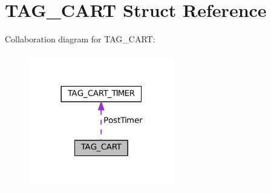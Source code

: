 \section{T\+A\+G\+\_\+\+C\+A\+R\+T Struct Reference}
\label{struct_t_a_g___c_a_r_t}


Collaboration diagram for T\+A\+G\+\_\+\+C\+A\+R\+T\+:
\nopagebreak
\begin{figure}[H]
\begin{center}
\leavevmode
\includegraphics[width=182pt]{struct_t_a_g___c_a_r_t__coll__graph}
\end{center}
\end{figure}
